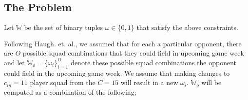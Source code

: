 \documentclass[12pt,oneside,a4paper]{book}
\theoremstyle{definition}
\theoremstyle{remark}
\begin{document}
				\subsection{The Problem} \label{sec:the_problem}

					Let $\mathbb{W}$ be the set of binary tuples $\omega \in  \{0,1\}$ that satisfy the above constraints.

					Following Haugh. et. al.\cite{haugh2021play}, we assumed that for each a particular opponent, there are $O$  possible squad combinations that they could field in upcoming game week and let $\mathbb{W}_o = \{\omega_i\}^O_{i=1}$ denote these possible squad combinations the opponent could field in the upcoming game week.
					We assume that making changes to $c_{in}=11$ player squad from the $C=15$ will result in a new $\omega_i$. $\mathbb{W}_{o}$ will be computed as a combination of the following;
\end{document}
